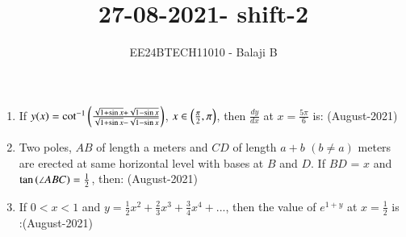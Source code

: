 \documentclass[journal]{IEEEtran}
\begin{document}

\vspace{3cm}

\title{27-08-2021- shift-2}
\author{EE24BTECH11010 - Balaji B}
{\let\newpage\relax\maketitle}
\begin{enumerate}
    \item If $y(x) = \cot^{-1}\left(\frac{\sqrt{1 + \sin{x}} + \sqrt{1 - \sin{x}}}{\sqrt{1 + \sin{x}} - \sqrt{1 - \sin{x}}}\right)$, $x \in \left(\frac{\pi}{2}, \pi\right)$, then $\frac{dy}{dx}$ at $x = \frac{5\pi}{6}$ is: \hfill (August-2021)
    \begin{enumerate}
    \end{enumerate}
    \item Two poles, $AB$ of length a meters and $CD$ of length $ a + b$ $(b \neq a) $ meters are erected at same horizontal level with bases at $B$ and $D$. If $BD$ = $x$ and $\tan\left(\angle{ABC}\right) = \frac{1}{2}$, then: \hfill (August-2021)
    \begin{enumerate}
    \end{enumerate}
    \item If $0 < x < 1$ and $y = \frac{1}{2}x^2 + \frac{2}{3}x^3 + \frac{3}{4}x^4 + ...$, then the value of $e^{1+y}$ at $x = \frac{1}{2}$ is\\:\hfill (August-2021)
    \begin{enumerate}

\end{enumerate}
\end{enumerate}
\end{document}
